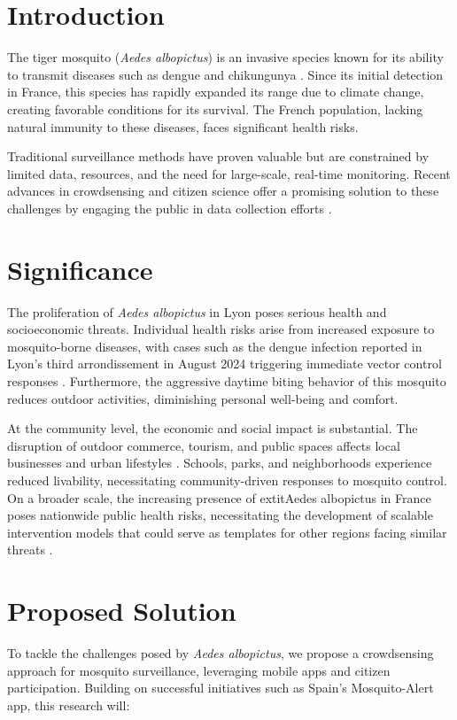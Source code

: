 \documentclass[acmlarge]{acmart}
\begin{document}
\maketitle

\section{Introduction}
The tiger mosquito (\textit{Aedes albopictus}) is an invasive species known for its ability to transmit diseases such as dengue and chikungunya \cite{BONIZZONI2013460}. Since its initial detection in France, this species has rapidly expanded its range due to climate change, creating favorable conditions for its survival. The French population, lacking natural immunity to these diseases, faces significant health risks.

Traditional surveillance methods have proven valuable but are constrained by limited data, resources, and the need for large-scale, real-time monitoring. Recent advances in crowdsensing and citizen science offer a promising solution to these challenges by engaging the public in data collection efforts \cite{Sousa-2022}.

\section{Significance}
The proliferation of \textit{Aedes albopictus} in Lyon poses serious health and socioeconomic threats. 
Individual health risks arise from increased exposure to mosquito-borne diseases, with cases such as the dengue infection reported in Lyon’s third arrondissement in August 2024 triggering immediate vector control responses \cite{dengue_lyon}. Furthermore, the aggressive daytime biting behavior of this mosquito reduces outdoor activities, diminishing personal well-being and comfort.

At the community level, the economic and social impact is substantial. The disruption of outdoor commerce, tourism, and public spaces affects local businesses and urban lifestyles \cite{haderer:hal-00783873}. Schools, parks, and neighborhoods experience reduced livability, necessitating community-driven responses to mosquito control.
On a broader scale, the increasing presence of 	extit{Aedes albopictus} in France poses nationwide public health risks, necessitating the development of scalable intervention models that could serve as templates for other regions facing similar threats \cite{article}.

\section{Proposed Solution}
To tackle the challenges posed by \textit{Aedes albopictus}, we propose a crowdsensing approach for mosquito surveillance, leveraging mobile apps and citizen participation\cite{SHANG2023101788}\cite{ROLPH2017210}. Building on successful initiatives such as Spain's Mosquito-Alert app, this research will:
\end{document}
